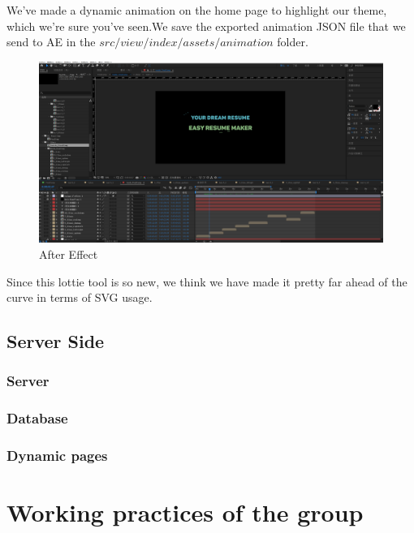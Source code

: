 \documentclass[11pt]{article}
\begin{document}
\begin{spacing}{1.0}
\begin{itemize}
We've made a dynamic animation on the home page to highlight our theme, which we're sure you've seen.We save the exported animation JSON file that we send to AE in the $src/view/index/assets/animation$ folder.
\begin{figure}[H]
	\centering
	\includegraphics[scale=0.2]{figures/ae.png}
	\caption{After Effect}
	\label{fig:6}
\end{figure}
Since this lottie tool is so new, we think we have made it pretty far ahead of the curve in terms of SVG usage.

	\end{itemize}
	\subsection{Server Side}
	\subsubsection{Server}
	\subsubsection{Database}
	\subsubsection{Dynamic pages}
	
	\section{Working practices of the group}
	

	
	
\end{spacing}	
	
\end{document}
